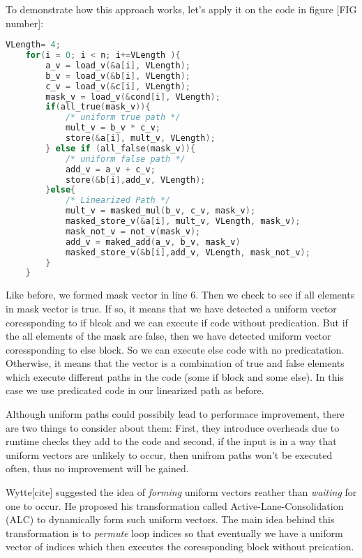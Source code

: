 \documentclass[\main/thesis.tex]{subfiles}
\begin{document}
To demonstrate how this approach works, let's apply it on the code in figure [FIG number]:

\begin{lstlisting}[language=C]
    VLength= 4;
    for(i = 0; i < n; i+=VLength ){
        a_v = load_v(&a[i], VLength);
        b_v = load_v(&b[i], VLength);
        c_v = load_v(&c[i], VLength);
        mask_v = load_v(&cond[i], VLength);
        if(all_true(mask_v)){
            /* uniform true path */
            mult_v = b_v * c_v;
            store(&a[i], mult_v, VLength);
        } else if (all_false(mask_v)){
            /* uniform false path */
            add_v = a_v + c_v;
            store(&b[i],add_v, VLength);
        }else{
            /* Linearized Path */
            mult_v = masked_mul(b_v, c_v, mask_v);
            masked_store_v(&a[i], mult_v, VLength, mask_v);
            mask_not_v = not_v(mask_v);
            add_v = maked_add(a_v, b_v, mask_v)
            masked_store_v(&b[i],add_v, VLength, mask_not_v);
        }
    }
\end{lstlisting}

Like before, we formed mask vector in line 6. Then we check to see if all elements in mask vector is true. If so, it means that we have detected a uniform vector coressponding to if blcok and we can execute if code without predication. But if the all elements of the mask are false, then we have detected 
uniform vector coressponding to else block. So we can execute else code with no predicatation. Otherwise, it means that the vector is a combination of true and false elements which execute different paths in the code (some if block and some else). In this case we use predicated code in our linearized path as before.

Although uniform paths could possibily lead to performace improvement, there are two things to consider about them: First, they introduce overheads due to runtime checks they add to the code and second, if the input is in a way that uniform vectors are unlikely to occur, then unifrom paths
won't be executed often, thus no improvement will be gained.

Wytte[cite] suggested the idea of \emph{forming} uniform vectors reather than \emph{waiting} for one to occur. He proposed his transformation called Active-Lane-Consolidation (ALC) to dynamically form such uniform vectors. The main idea behind this transformation is to \emph{permute} loop indices
so that eventually we have a uniform vector of indices which then executes the coressponding block without preication. 
\end{document}
